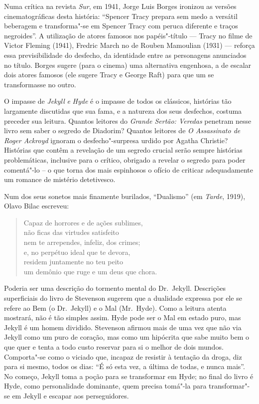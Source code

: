 Numa crítica na revista \textit{Sur}, em 1941, Jorge Luis Borges
ironizou as versões cinematográficas desta história: “Spencer Tracy
prepara sem medo a versátil beberagem e transforma"-se em Spencer Tracy
com peruca diferente e traços negroides”.  A utilização de atores
famosos nos papéis"-título --- Tracy no filme de Victor Fleming (1941),
Fredric March no de Rouben Mamoulian (1931) --- reforça essa
previsibilidade do desfecho, da identidade entre as personagens
anunciados no título. Borges sugere (para o cinema) uma alternativa
engenhosa, a de escalar dois atores famosos (ele sugere Tracy e George
Raft) para que um se transformasse no outro.  

O impasse de \textit{Jekyll }\textit{e}\textit{ Hyde} é o impasse de
todos os clássicos, histórias tão largamente discutidas que sua fama, e
a natureza dos seus desfechos, costuma preceder sua leitura.  Quantos
leitores do \textit{Grande Sertão: Veredas} penetram nesse livro sem
saber o segredo de Diadorim?  Quantos leitores de \textit{O Assassinato
de Roger Ackroyd} ignoram o desfecho"-surpresa urdido por Agatha
\mbox{Christie?}  Histórias que contêm a revelação de um segredo crucial serão
sempre histórias problemáticas, inclusive para o crítico, obrigado a
revelar o segredo para poder comentá"-lo – o que torna dos mais
espinhosos o ofício de criticar adequadamente um romance de mistério
detetivesco.

Num dos seus sonetos mais finamente burilados, “Dualismo” (em
\textit{Tarde}, 1919), Olavo Bilac escreveu:


\begin{verse}
Capaz de horrores e de ações sublimes,\\
não ficas das virtudes satisfeito\\
nem te arrependes, infeliz, dos crimes;\\
e, no perpétuo ideal que te devora,\\
residem juntamente no teu peito\\
um demônio que ruge e um deus que chora.
\end{verse}

Poderia ser uma descrição do tormento mental do Dr.~Jekyll.  Descrições
superficiais do livro de Stevenson sugerem que a dualidade expressa por
ele se refere ao Bem (o Dr.~Jekyll) e o Mal (Mr.~Hyde).  Como a leitura
atenta mostrará, não é tão simples assim.  Hyde pode ser o Mal em
estado puro, mas Jekyll é um homem dividido.  Stevenson afirmou mais de
uma vez que não via Jekyll como um puro de coração, mas como um
hipócrita que sabe muito bem o que quer e tenta a todo custo reservar
para si o melhor de dois mundos.  Comporta"-se como o viciado que,
incapaz de resistir à tentação da droga, diz para si mesmo, todos os
dias: “É só esta vez, a última de todas, e nunca mais”.  No começo,
Jekyll toma a poção para se transformar em Hyde; no final do livro é
Hyde, como personalidade dominante, quem precisa tomá"-la para
transformar"-se em Jekyll e escapar aos perseguidores. 

